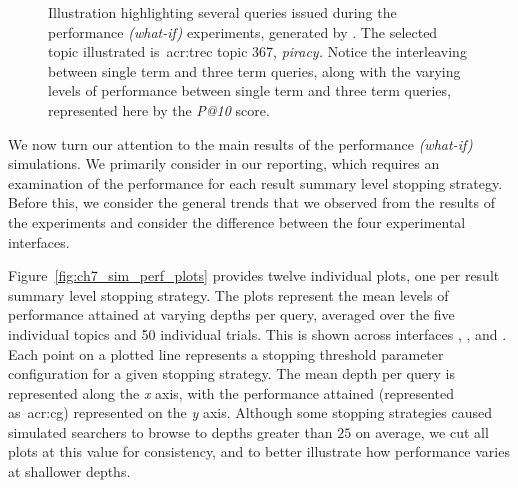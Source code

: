 \begin{figure}[t!]
    \centering
    \caption[Example queries generated by ]{Illustration highlighting several queries issued during the performance \emph{(what-if)} experiments, generated by . The selected topic illustrated is~\gls{acr:trec} topic 367, \emph{piracy.} Notice the interleaving between single term and three term queries, along with the varying levels of performance between single term and three term queries, represented here by the \emph{P@10} score.}
    \label{fig:ch7_example_queries}
\end{figure}

We now turn our attention to the main results of the performance \emph{(what-if)} simulations. We primarily consider  in our reporting, which requires an examination of the performance for each result summary level stopping strategy. Before this, we consider the general trends that we observed from the results of the experiments and consider the difference between the four experimental interfaces.

Figure~\ref{fig:ch7_sim_perf_plots} provides twelve individual plots, one per result summary level stopping strategy. The plots represent the mean levels of performance attained at varying depths per query, averaged over the five individual topics and 50 individual trials. This is shown across interfaces , ,  and . Each point on a plotted line represents a stopping threshold parameter configuration for a given stopping strategy. The mean depth per query is represented along the \emph{x} axis, with the performance attained (represented as~\gls{acr:cg}) represented on the \emph{y} axis. Although some stopping strategies caused simulated searchers to browse to depths greater than $25$ on average, we cut all plots at this value for consistency, and to better illustrate how performance varies at shallower depths.

